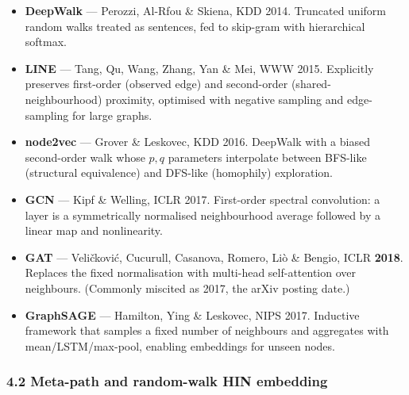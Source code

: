 \begin{itemize}\itemsep2pt
\item \textbf{DeepWalk} --- Perozzi, Al-Rfou \& Skiena, KDD 2014. Truncated uniform random walks
  treated as sentences, fed to skip-gram with hierarchical softmax.
\item \textbf{LINE} --- Tang, Qu, Wang, Zhang, Yan \& Mei, WWW 2015. Explicitly preserves
  first-order (observed edge) and second-order (shared-neighbourhood) proximity, optimised with
  negative sampling and edge-sampling for large graphs.
\item \textbf{node2vec} --- Grover \& Leskovec, KDD 2016. DeepWalk with a biased second-order walk
  whose $p,q$ parameters interpolate between BFS-like (structural equivalence) and DFS-like
  (homophily) exploration.
\item \textbf{GCN} --- Kipf \& Welling, ICLR 2017. First-order spectral convolution: a layer is a
  symmetrically normalised neighbourhood average followed by a linear map and nonlinearity.
\item \textbf{GAT} --- Veli\v{c}kovi\'{c}, Cucurull, Casanova, Romero, Li\`{o} \& Bengio, ICLR
  \textbf{2018}. Replaces the fixed normalisation with multi-head self-attention over neighbours.
  (Commonly miscited as 2017, the arXiv posting date.)
\item \textbf{GraphSAGE} --- Hamilton, Ying \& Leskovec, NIPS 2017. Inductive framework that
  samples a fixed number of neighbours and aggregates with mean/LSTM/max-pool, enabling embeddings
  for unseen nodes.
\end{itemize}

\subsubsection*{4.2 Meta-path and random-walk HIN embedding}

